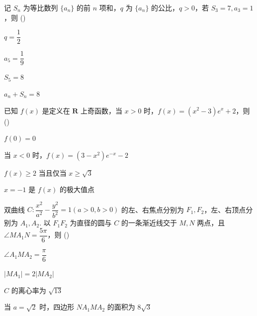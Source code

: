 \documentclass{exam-zh}
\begin{document}

\begin{question}
记 $S_n$ 为等比数列 $\{a_n\}$ 的前 $n$ 项和，$q$ 为 $\{a_n\}$ 的公比，$q>0$，若 $S_3=7, a_3=1$，则
(\hspace{1cm})
\begin{choices}
\item $q=\dfrac{1}{2}$
\item $a_5=\dfrac{1}{9}$
\item $S_5=8$
\item $a_n+S_n=8$
\end{choices}
\end{question}


\begin{question}
已知 $f(x)$ 是定义在 $\mathbf{R}$ 上奇函数，当 $x>0$ 时，$f(x)=(x^2-3)e^x+2$，则
(\hspace{1cm})
\begin{choices}
\item $f(0)=0$
\item 当 $x<0$ 时，$f(x)=(3-x^2)e^{-x}-2$
\item $f(x) \geqslant 2$ 当且仅当 $x \geqslant \sqrt{3}$
\item $x=-1$ 是 $f(x)$ 的极大值点
\end{choices}
\end{question}


\begin{question}
双曲线 $C: \dfrac{x^2}{a^2} - \dfrac{y^2}{b^2} = 1 (a>0, b>0)$ 的左、右焦点分别为 $F_1, F_2$，左、右顶点分别为 $A_1, A_2$. 以 $F_1 F_2$ 为直径的圆与 $C$ 的一条渐近线交于 $M,N$ 两点，且 $\angle MA_1N = \dfrac{5\pi}{6}$，则
(\hspace{1cm})
\begin{choices}
\item $\angle A_1MA_2 = \dfrac{\pi}{6}$
\item $|MA_1|=2|MA_2|$
\item $C$ 的离心率为 $\sqrt{13}$
\item 当 $a=\sqrt{2}$ 时，四边形 $NA_1MA_2$ 的面积为 $8\sqrt{3}$
\end{choices}
\end{question}
\end{document}
